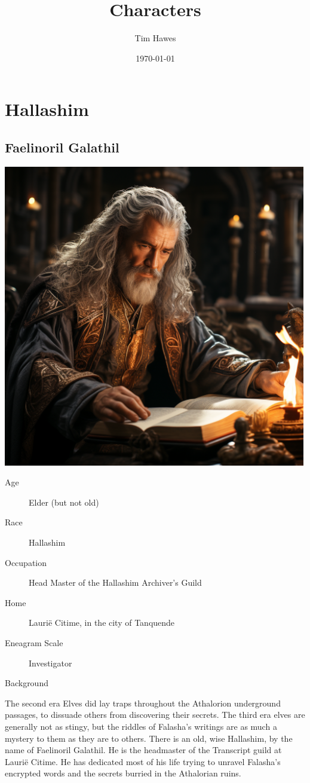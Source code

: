\documentclass[11pt]{article}
\author{Tim Hawes}
\date{\today}
\title{Characters}
\begin{document}
\maketitle
\tableofcontents


\section*{Hallashim}
\label{sec:org0889d9d}
\subsection*{Faelinoril Galathil}
\label{sec:orgfac1739}

\begin{center}
\includegraphics[width=500px]{./img/Faelinoril_Galathil.png}
\end{center}

\begin{description}
\item[{Age}] Elder (but not old)
\item[{Race}] Hallashim
\item[{Occupation}] Head Master of the Hallashim Archiver's Guild
\item[{Home}] Laurië Citime, in the city of Tanquende
\item[{Eneagram Scale}] Investigator
\item[{Background}] 
\end{description}
The second era Elves did lay traps throughout the Athalorion underground passages, to dissuade others from discovering their secrets.
The third era elves are generally not as stingy, but the riddles of Falasha's writings are as much a mystery to them as they are to others.
There is an old, wise Hallashim, by the name of Faelinoril Galathil. He is the headmaster of the Transcript guild at Laurië Citime. He has dedicated most of his life trying to unravel Falasha's encrypted words and the secrets burried in the Athalorian ruins.
\end{document}
